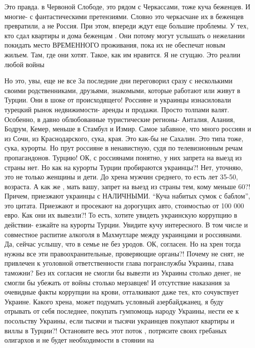 \begin{itemize}
Это правда. в Червоной Слободе, это рядом с Черкассами, тоже куча беженцев. И
многие- с фантастическими претензиями. Словно это черкасчане их в беженцев
превратили, а не Россия. При этом, впереди ждут еще большие проблемы. У тех,
кто сдал квартиры и дома беженцам . Они потому могут услышать о нежелании
покидать место ВРЕМЕННОГО проживания, пока их не обеспечат новым жильем. Там,
где они хотят. Такое, как им нравится. Я не сгущаю. Это реалии любой войны

\begin{itemize} %

Но это, увы, еще не все За последние дни переговорил сразу с несколькими своими
родственниками, друзьями, знакомыми, которые работают или живут в Турции. Они
в шоке от происходящего! Россияне и украинцы изнасиловали турецкий рынок
недвижимости- аренды и продажи. Просто толпами валят. Особенно, в давно
облюбованные туристические регионы- Анталия, Алания, Бодрум, Кемер, меньше в
Стамбул и Измир. Самое забавное, что много россиян и из Сочи, из
Краснодарского, сука, края. Это как-бы не Сахалин. Это типа тоже, сука,
курорты. Но прут россияне в ненавистную, судя по телевизионным речам
пропагандонов. Турцию! ОК, с россиянами понятно, у них запрета на выезд из
страны нет. Но как на курорты Турции пробираются украинцы?! Нет, уточняю, это
не только женщины и дети. До хрена мужчин среднего, то есть лет 35-50,
возраста. А как же , мать вашу, запрет на выезд из страны тем, кому меньше 60?!
Причем, приезжают украинцы с НАЛИЧНЫМИ. \enquote{Куча набитых сумок с баблом}, это
цитата. Приезжают и просекают на дорогущих авто, стоимостью от 100 000 евро.
Как они их вывезли?! То есть, хотите увидеть украинскую коррупцию в действии-
езжайте на курорты Турции. Увидите кучу интересного. В том числе и совместное
распитие алкоголя в Махмутларе между украинцами и россиянами. Да, сейчас
услышу, что в семье не без уродов. ОК, согласен. Но на хрен тогда нужны все эти
правоохранительные, проверяющие органы?! Почему не снят, не привлечен к
уголовной ответственности глава погранслужбы Украины, глава таможни? Без их
согласия не смогли бы вывезти из Украины столько денег, не смогли бы убежать от
войны столько мерзавцев! И отсутствие наказания за очевидные факты коррупции на
крови, отталкивают даже тех, кто сочувствует Украине. Какого хрена, может
подумать условный азербайджанец, я буду отрывать от себя последнее, покупать
гумпомощь народу Украины, нести ее к посольству Украины, если тысячи и тысячи
украинцев покупают квартиры и виллы в Турции?! Остановите весь этот поток ,
потрясите своих гребаных олигархов и не будет необходимости в стоянии на

\end{itemize}
\end{itemize}
